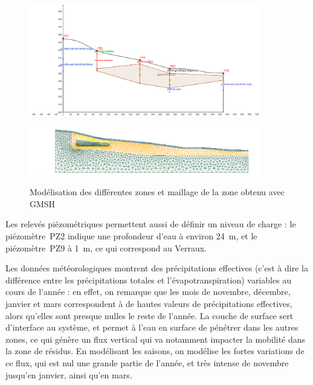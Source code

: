 \documentclass{article}
\begin{document}
\begin{figure}[H]
    \centering
    \begin{minipage}{0.5\textwidth}
        \centering
        \includegraphics[width=0.9\textwidth]{III_B_3_3.png} 
        \label{fig:zones_ribieres_geogebra}
    \end{minipage}\hfill
    \begin{minipage}{0.5\textwidth}
        \includegraphics[width=0.9\textwidth]{III_B_3_4.png} 
        \label{maillage_ribiere}
    \end{minipage}
    \caption{Modélisation des différentes zones et maillage de la zone obtenu avec GMSH}
\end{figure}


Les relevés piézométriques permettent aussi de définir un niveau de charge : le piézomètre~PZ2 indique une profondeur d’eau à environ 24~m, et le piézomètre~PZ9 à 1~m, ce qui correspond au Verraux.

Les données météorologiques montrent des précipitations effectives (c’est à dire la différence entre les précipitations totales et l’évapotranspiration) variables au cours de l’année : en effet, on remarque que les mois de novembre, décembre, janvier et mars correspondent à de hautes valeurs de précipitations effectives, alors qu’elles sont presque nulles le reste de l’année. La couche de surface sert d'interface au système, et permet à l'eau en surface de pénétrer dans les autres zones, ce qui génère un flux vertical qui va notamment impacter la mobilité dans la zone de résidus. En modélisant les saisons, on modélise les fortes variations de ce flux, qui est nul une grande partie de l'année, et très intense de novembre jusqu'en janvier, ainsi qu'en mars.
\end{document}
